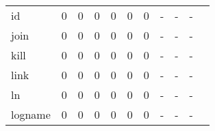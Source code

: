 \begin{longtable}{lp{1.2cm}p{1.2cm}p{1.2cm}p{1.2cm}p{1.2cm}p{1.2cm}p{1.2cm}p{1.2cm}p{1.2cm}p{1.2cm}}
id        &                                     0 &                                                  0 &                                                  0 &                                                  0 &                                                  0 &                                                  0 &                                                  - &                                                  - &                                                  - \\
join      &                                     0 &                                                  0 &                                                  0 &                                                  0 &                                                  0 &                                                  0 &                                                  - &                                                  - &                                                  - \\
kill      &                                     0 &                                                  0 &                                                  0 &                                                  0 &                                                  0 &                                                  0 &                                                  - &                                                  - &                                                  - \\
link      &                                     0 &                                                  0 &                                                  0 &                                                  0 &                                                  0 &                                                  0 &                                                  - &                                                  - &                                                  - \\
ln        &                                     0 &                                                  0 &                                                  0 &                                                  0 &                                                  0 &                                                  0 &                                                  - &                                                  - &                                                  - \\
logname   &                                     0 &                                                  0 &                                                  0 &                                                  0 &                                                  0 &                                                  0 &                                                  - &                                                  - &                                                  - \\

\end{longtable}
